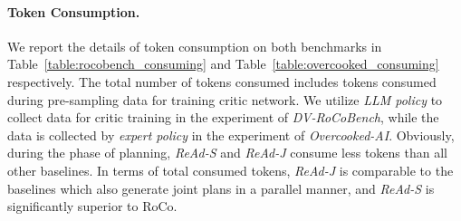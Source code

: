 \documentclass[11pt]{article}
\theoremstyle{plain}
\theoremstyle{remark}
\begin{document}
\paragraph{Token Consumption.}
We report the details of token consumption on both benchmarks in Table~\ref{table:rocobench_consuming} and Table~\ref{table:overcooked_consuming} respectively. 
The total number of tokens consumed includes tokens consumed during pre-sampling data for training critic network.
We utilize \emph{LLM policy} to collect data for critic training in the experiment of \emph{DV-RoCoBench}, while the data is collected by \emph{expert policy} in the experiment of \emph{Overcooked-AI}. Obviously, during the phase of planning, \emph{ReAd-S} and \emph{ReAd-J} consume less tokens than all other baselines. In terms of total consumed tokens, \emph{ReAd-J} is comparable to the baselines which also generate joint plans in a parallel manner, and \emph{ReAd-S} is significantly superior to RoCo.

\end{document}
